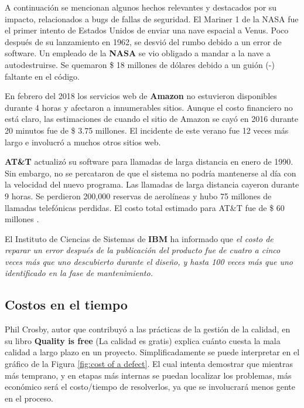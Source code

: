 A continuación se mencionan algunos hechos relevantes y destacados por su impacto, relacionados a bugs de fallas de seguridad. 
El Mariner 1 de la NASA fue el primer intento de Estados Unidos de enviar una nave espacial a Venus. Poco después de su lanzamiento en 1962, se desvió del rumbo debido a un error de software. Un empleado de la \textbf{NASA} se vio obligado a mandar a la nave a autodestruirse. Se quemaron \$ 18 millones de dólares debido a un guión (-) faltante en el código\cite{TrueCostSoftBugCelerity}.

En febrero del 2018 los servicios web de \textbf{Amazon} no estuvieron disponibles durante 4 horas y afectaron a innumerables sitios. Aunque el costo financiero no está claro, las estimaciones de cuando el sitio de Amazon se cayó en 2016 durante 20 minutos fue de \$ 3.75 millones. El incidente de este verano fue 12 veces más largo e involucró a muchos otros sitios web.

\textbf{AT\&T} actualizó su software para llamadas de larga distancia en enero de 1990. Sin embargo, no se percataron de que el sistema no podría mantenerse al día con la velocidad del nuevo programa. Las llamadas de larga distancia cayeron durante 9 horas. Se perdieron 200,000 reservas de aerolíneas y hubo 75 millones de llamadas telefónicas perdidas. El costo total estimado para AT\&T fue de \$ 60 millones \cite{TrueCostSoftBugCBT}.

El Instituto de Ciencias de Sistemas de \textbf{IBM} ha informado que \textit{el costo de reparar un error después de la publicación del producto fue de cuatro a cinco veces más que uno descubierto durante el diseño, y hasta 100 veces más que uno identificado en la fase de mantenimiento.}


\subsection{Costos en el tiempo}
Phil Crosby, autor que contribuyó a las prácticas de la gestión de la calidad, en su libro \textbf{Quality is free} (La calidad es gratis) explica cuánto cuesta la mala calidad a largo plazo en un proyecto. Simplificadamente se puede interpretar en el gráfico de la Figura \ref{fig:cost of a defect}. El cual intenta demostrar que mientras más temprano, y en etapas más internas se puedan localizar los problemas, más económico será el costo/tiempo de resolverlos, ya que se involucrará menos gente en el proceso.

